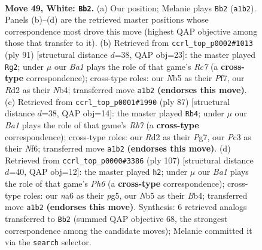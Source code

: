 \documentclass[11pt]{article}
\begin{document}
\clearpage

\begin{figure}[p]\centering
\begin{subfigure}{0.46\textwidth}\centering
\resizebox{\linewidth}{!}{%
\newchessgame
\chessboard[
  setfen={6k1/1p2p3/n5pp/pN5r/P1p5/2P2PK1/3R4/B7 w - - 3 49},
  showmover=false,
  pgfstyle=straightmove, color=movearrow, markmove={a1-b2}
]}
\caption{}
\end{subfigure}\hfill
\begin{subfigure}{0.46\textwidth}\centering
\resizebox{\linewidth}{!}{%
\newchessgame
\chessboard[
  setfen={5k2/3R1pp1/4p3/pN6/Pn3P2/1P2K1P1/2r5/8 b - - 0 46},
  showmover=false,
  pgfstyle=straightmove, color=movearrow, markmove={c2-g2}
]}
\caption{}
\end{subfigure}
\\[4pt]
\begin{subfigure}{0.46\textwidth}\centering
\resizebox{\linewidth}{!}{%
\newchessgame
\chessboard[
  setfen={5k2/5pp1/5n1p/8/p6P/3PNPP1/1r6/R5K1 b - - 8 44},
  showmover=false,
  pgfstyle=straightmove, color=movearrow, markmove={b2-b4}
]}
\caption{}
\end{subfigure}\hfill
\begin{subfigure}{0.46\textwidth}\centering
\resizebox{\linewidth}{!}{%
\newchessgame
\chessboard[
  setfen={5k2/p4p2/5P2/2pP2P1/1bN2P2/5K1p/r7/1R6 b - - 2 54},
  showmover=false,
  pgfstyle=straightmove, color=movearrow, markmove={h3-h2}
]}
\caption{}
\end{subfigure}
\caption{\textbf{Move 49, White: \texttt{Bb2}.} (a) Our position; Melanie plays \texttt{Bb2} (\texttt{a1b2}). Panels (b)--(d) are the retrieved master positions whose correspondence most drove this move (highest QAP objective among those that transfer to it). (b) Retrieved from \texttt{ccrl\_top\_p0002\#1013} (ply 91) [structural distance $d$=38, QAP obj=23]: the master played \texttt{Rg2}; under $\mu$ our \emph{Ba1} plays the role of that game's \emph{Rc7} (a \textbf{cross-type} correspondence); cross-type roles: our \emph{N}b5 as their \emph{P}f7, our \emph{R}d2 as their \emph{N}b4; transferred move \texttt{a1b2} \textbf{(endorses this move)}. (c) Retrieved from \texttt{ccrl\_top\_p0001\#1990} (ply 87) [structural distance $d$=38, QAP obj=14]: the master played \texttt{Rb4}; under $\mu$ our \emph{Ba1} plays the role of that game's \emph{Rb7} (a \textbf{cross-type} correspondence); cross-type roles: our \emph{R}d2 as their \emph{P}g7, our \emph{P}c3 as their \emph{N}f6; transferred move \texttt{a1b2} \textbf{(endorses this move)}. (d) Retrieved from \texttt{ccrl\_top\_p0000\#3386} (ply 107) [structural distance $d$=40, QAP obj=12]: the master played \texttt{h2}; under $\mu$ our \emph{Ba1} plays the role of that game's \emph{Ph6} (a \textbf{cross-type} correspondence); cross-type roles: our \emph{n}a6 as their \emph{p}g5, our \emph{N}b5 as their \emph{B}b4; transferred move \texttt{a1b2} \textbf{(endorses this move)}. Synthesis: 6 retrieved analogs transferred to \texttt{Bb2} (summed QAP objective 68, the strongest correspondence among the candidate moves); Melanie committed it via the \texttt{search} selector.}
\label{fig:thought-m96}
\end{figure}
\end{document}
